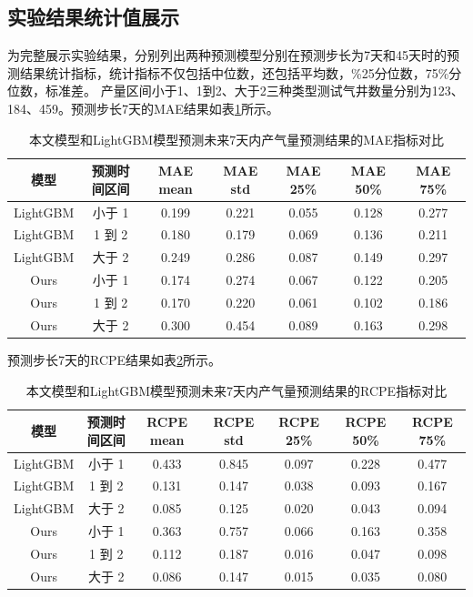 \subsection{实验结果统计值展示}
为完整展示实验结果，分别列出两种预测模型分别在预测步长为7天和45天时的预测结果统计指标，统计指标不仅包括中位数，还包括平均数，\%25分位数，75\%分位数，标准差。
产量区间小于1、1到2、大于2三种类型测试气井数量分别为123、184、459。预测步长7天的MAE结果如表\ref{tab:MAE7}所示。
\begin{table}[H]
    \renewcommand{\arraystretch}{1.5}
    \centering
    \caption{本文模型和LightGBM模型预测未来7天内产气量预测结果的MAE指标对比}
    \label{tab:MAE7}
    \begin{tabular}{|c|c|c|c|c|c|c|}
    \hline
    模型     & 预测时间区间 & MAE mean & MAE std & MAE 25\% & MAE 50\% & MAE 75\% \\ \hline
    LightGBM & 小于 1      & 0.199    & 0.221   & 0.055    & 0.128    & 0.277    \\ \hline
    LightGBM & 1 到 2      & 0.180    & 0.179   & 0.069    & 0.136    & 0.211    \\ \hline
    LightGBM & 大于 2      & 0.249    & 0.286   & 0.087    & 0.149    & 0.297    \\ \hline
    Ours      & 小于 1      & 0.174    & 0.274   & 0.067    & 0.122    & 0.205    \\ \hline
    Ours      & 1 到 2      & 0.170    & 0.220   & 0.061    & 0.102    & 0.186    \\ \hline
    Ours      & 大于 2      & 0.300    & 0.454   & 0.089    & 0.163    & 0.298    \\ \hline
    \end{tabular}
\end{table}
预测步长7天的RCPE结果如表\ref{tab:RCPE7}所示。
\begin{table}[H]
    \renewcommand{\arraystretch}{1.5}
    \centering
    \caption{本文模型和LightGBM模型预测未来7天内产气量预测结果的RCPE指标对比}
    \label{tab:RCPE7}
    \begin{tabular}{|c|c|c|c|c|c|c|} %
    \hline
    模型     & 预测时间区间 & RCPE mean & RCPE std & RCPE 25\% & RCPE 50\% & RCPE 75\% \\ \hline
    LightGBM & 小于 1      & 0.433     & 0.845    & 0.097     & 0.228     & 0.477     \\ \hline
    LightGBM & 1 到 2      & 0.131     & 0.147    & 0.038     & 0.093     & 0.167     \\ \hline
    LightGBM & 大于 2      & 0.085     & 0.125    & 0.020     & 0.043     & 0.094     \\ \hline
    Ours      & 小于 1      & 0.363     & 0.757    & 0.066     & 0.163     & 0.358     \\ \hline
    Ours      & 1 到 2      & 0.112     & 0.187    & 0.016     & 0.047     & 0.098     \\ \hline
    Ours      & 大于 2      & 0.086     & 0.147    & 0.015     & 0.035     & 0.080     \\ \hline
    \end{tabular}
\end{table}
